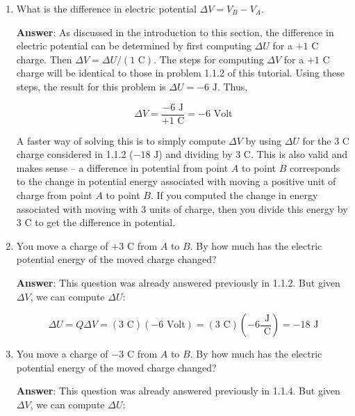 \documentclass{article}
\begin{document}
\begin{enumerate}

  \item What is the difference in electric potential $\Delta V = V_B-V_A$.

        \ifsolutions
          \textbf{Answer}: As discussed in the introduction to this section, the difference in electric potential can be determined by first computing $\Delta U$ for a $+1\text{ C}$ charge. Then $\Delta V = \Delta U/(1\text{ C})$. The steps for computing $\Delta V$ for a $+1\text{ C}$ charge will be identical to those in problem 1.1.2 of this tutorial. Using these steps, the result for this problem is $\Delta U=-6\text{ J}$. Thus,
        
          \begin{equation}\Delta V = \frac{-6\text{ J}}{+1\text{ C}}= -6\text{ Volt}\end{equation}
        
          A faster way of solving this is to simply compute $\Delta V$ by using $\Delta U$ for the $3\text{ C}$ charge considered in 1.1.2 ($-18\text{ J}$) and dividing by $3\text{ C}$. This is also valid and makes sense -- a difference in potential from point $A$ to point $B$ corresponds to the change in potential energy associated with moving a positive unit of charge from point $A$ to point $B$. If you computed the change in energy associated with moving with 3 units of charge, then you divide this energy by $3\text{ C}$ to get the difference in potential.
        \fi

  \item You move a charge of $+3\text{ C}$ from $A$ to $B$. By how much has the electric potential energy of the moved charge changed?

        \ifsolutions
          \textbf{Answer}: This question was already answered previously in 1.1.2. But given $\Delta V$, we can compute $\Delta U$:
        
          \begin{equation}\Delta U = Q\Delta V=(3\text{ C})(-6\text{ Volt})=(3\text{ C})\left(-6\frac{\text{ J}}{ \text{ C}}\right)=-18\text{ J}\end{equation}
        \fi

  \item You move a charge of $-3\text{ C}$ from $A$ to $B$. By how much has the electric potential energy of the moved charge changed?

        \ifsolutions
          \textbf{Answer}: This question was already answered previously in 1.1.4. But given $\Delta V$, we can compute $\Delta U$:
        

\end{enumerate}
\end{document}
